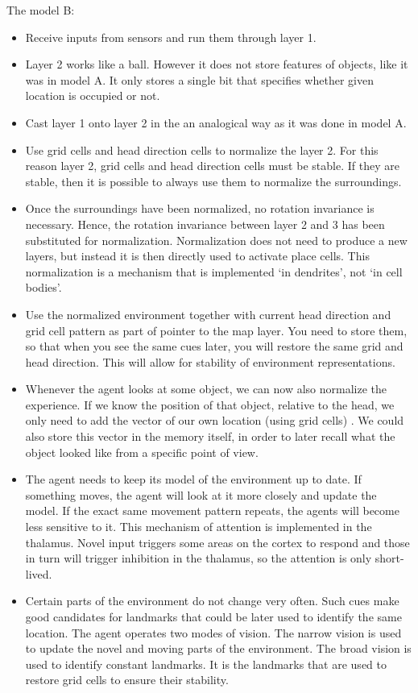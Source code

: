 \documentclass[12pt]{article}
\begin{document}
The model B:
\begin{itemize}
	\item Receive inputs from sensors and run them through layer 1.
	\item Layer 2 works like a ball. However it does not store features of objects, like it was in model A. It only stores a single bit that specifies whether given location is occupied or not.
	\item Cast layer 1 onto layer 2 in the an analogical way as it was done in model A.
	\item Use grid cells and head direction cells to normalize the layer 2. For this reason layer 2, grid cells and head direction cells must be stable. If they are stable, then it is possible to always use them to normalize the surroundings.
	\item Once the surroundings have been normalized, no rotation invariance is necessary. Hence, the rotation invariance between layer 2 and 3 has been substituted for normalization. Normalization does not need to produce a new layers, but instead it is then directly used to activate place cells. This normalization is a mechanism that is implemented `in dendrites', not `in cell bodies'.
	\item Use the normalized environment together with current head direction and grid cell pattern as part of pointer to the map layer. You need to store them, so that when you see the same cues later, you will restore the same grid and head direction. This will allow for stability of environment representations.
	\item Whenever the agent looks at some object, we can now also normalize the experience. If we know the position of that object, relative to the head, we only need to add the vector of our own location (using grid cells) . We could also store this vector in the memory itself, in order to later recall what the object looked like from a specific point of view.
	\item The agent needs to keep its model of the environment up to date. If something moves, the agent will look at it more closely and update the model. If the exact same movement pattern repeats, the agents will become less sensitive to it. This mechanism of attention is implemented in the thalamus. Novel input triggers some areas on the cortex to respond and those in turn will trigger inhibition in the thalamus, so the attention is only short-lived. 
	\item Certain parts of the environment do not change very often. Such cues make good candidates for landmarks that could be later used to identify the same location. The agent operates two modes of vision. The narrow vision is used to update the novel and moving parts of the environment. The broad vision is used to identify constant landmarks. It is the landmarks that are used to restore grid cells to ensure their stability.

\end{itemize}
\end{document}
